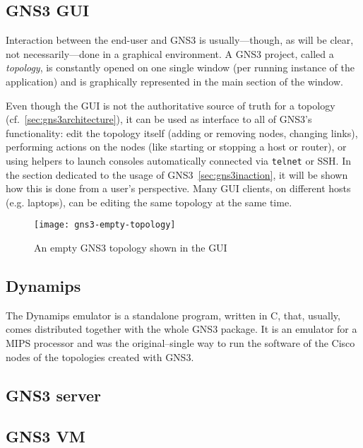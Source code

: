 \subsection{GNS3 GUI}
\label{subsec:gns3gui}

Interaction between the end-user and GNS3 is usually---though, as will be clear, not necessarily---done in a graphical environment.
A GNS3 project, called a \emph{topology}, is constantly opened on one single window (per running instance of the application) and is graphically represented in the main section of the window.

Even though the GUI is not the authoritative source of truth for a topology (cf.~\ref{sec:gns3architecture}), it can be used as interface to all of GNS3's functionality: edit the topology itself (adding or removing nodes, changing links), performing actions on the nodes (like starting or stopping a host or router), or using helpers to launch consoles automatically connected via \texttt{telnet} or SSH.
In the section dedicated to the usage of GNS3~\ref{sec:gns3inaction}, it will be shown how this is done from a user's perspective.
Many GUI clients, on different hosts (e.g. laptops), can be editing the same topology at the same time. %

\begin{figure}
  \centering
  \texttt{[image: gns3-empty-topology]}
  \caption{An empty GNS3 topology shown in the GUI}
  \label{fig:gns3-empty-topology}
\end{figure}

\subsection{Dynamips}
\label{subsec:gns3dynamips}

The Dynamips emulator is a standalone program, written in C, that, usually, comes distributed together with the whole GNS3 package.
It is an emulator for a MIPS processor and was the original--single way to run the software of the Cisco nodes of the topologies created with GNS3.


\subsection{GNS3 server}
\label{subsec:gns3server}


\subsection{GNS3 VM}
\label{subsec:gns3vm}

